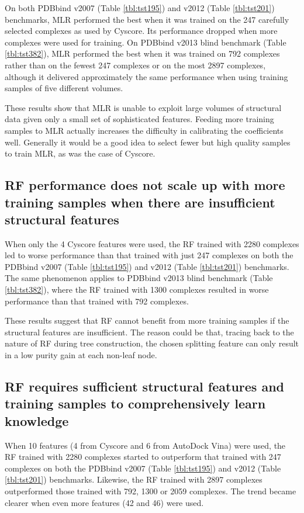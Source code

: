 \documentclass[journal=jacsat,manuscript=article]{achemso}
\begin{document}
On both PDBbind v2007 (Table \ref{tbl:tst195}) and v2012 (Table \ref{tbl:tst201}) benchmarks, MLR performed the best when it was trained on the 247 carefully selected complexes as used by Cyscore. Its performance dropped when more complexes were used for training. On PDBbind v2013 blind benchmark (Table \ref{tbl:tst382}), MLR performed the best when it was trained on 792 complexes rather than on the fewest 247 complexes or on the most 2897 complexes, although it delivered approximately the same performance when using training samples of five different volumes.

These results show that MLR is unable to exploit large volumes of structural data given only a small set of sophisticated features. Feeding more training samples to MLR actually increases the difficulty in calibrating the coefficients well. Generally it would be a good idea to select fewer but high quality samples to train MLR, as was the case of Cyscore.

\subsection{RF performance does not scale up with more training samples when there are insufficient structural features}

When only the 4 Cyscore features were used, the RF trained with 2280 complexes led to worse performance than that trained with just 247 complexes on both the PDBbind v2007 (Table \ref{tbl:tst195}) and v2012 (Table \ref{tbl:tst201}) benchmarks. The same phenomenon applies to PDBbind v2013 blind benchmark (Table \ref{tbl:tst382}), where the RF trained with 1300 complexes resulted in worse performance than that trained with 792 complexes.

These results suggest that RF cannot benefit from more training samples if the structural features are insufficient. The reason could be that, tracing back to the nature of RF during tree construction, the chosen splitting feature can only result in a low purity gain at each non-leaf node.

\subsection{RF requires sufficient structural features and training samples to comprehensively learn knowledge}

When 10 features (4 from Cyscore and 6 from AutoDock Vina) were used, the RF trained with 2280 complexes started to outperform that trained with 247 complexes on both the PDBbind v2007 (Table \ref{tbl:tst195}) and v2012 (Table \ref{tbl:tst201}) benchmarks. Likewise, the RF trained with 2897 complexes outperformed those trained with 792, 1300 or 2059 complexes. The trend became clearer when even more features (42 and 46) were used.
\end{document}

